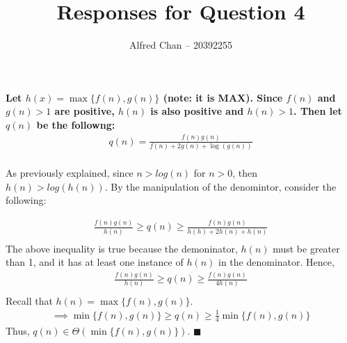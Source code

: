 \documentclass[12pt]{article}
\title{Responses for Question 4}
\author{Alfred Chan -- 20392255}
\begin{document}
\maketitle
{\bf
Let $h(x) = \max \{f(n),g(n)\}$ (note: it is MAX).
Since $f(n)$ and $g(n) > 1$ are positive, $h(n)$ is also positive and $h(n) > 1$.
Then let $q(n)$ be the followng:
\begin{gather*}
q(n) = \frac{f(n)g(n)}{f(n)+2g(n)+\log(g(n))}\\
\end{gather*}

As previously explained, since $n > log(n)$ for $n>0$, then $h(n) > log(h(n))$.
By the manipulation of the denomintor, consider the following:

\begin{gather*}
\frac{f(n)g(n)}{h(n)} \ge q(n) \ge \frac{f(n)g(n)}{h(h)+2h(n)+h(n)}\\
\end{gather*}
The above inequality is true because the demoninator, $h(n)$ must be greater than 1, and it has at least one instance of $h(n)$ in the denominator.
Hence,
\begin{gather*}
\frac{f(n)g(n)}{h(n)} \ge q(n) \ge \frac{f(n)g(n)}{4h(n)}\\
\end{gather*}
Recall that $h(n) = \max \{f(n),g(n)\}$.
\begin{gather*}
\implies \min \{f(n),g(n)\} \ge q(n) \ge \frac{1}{4} \min \{f(n),g(n)\}
\end{gather*}
Thus, $q(n) \in \Theta(\min \{f(n),g(n)\})$.
\hfill $\blacksquare$

}
\end{document}
